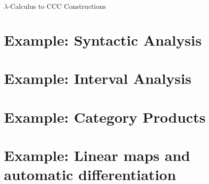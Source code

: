 \documentclass[10pt]{beamer}
\theoremstyle{definition}
\theoremstyle{remark}
\numberwithin{equation}{section}
\begin{document}
\begin{frame}[fragile]{$\lambda$-Calculus to CCC Constructions}
\end{frame}

\begin{frame}[fragile]{}
\end{frame}

\begin{frame}[fragile]{}
\end{frame}

\begin{frame}[fragile]{}
\end{frame}

\begin{frame}[fragile]{}
\end{frame}

\begin{frame}[fragile]{}
\end{frame}

\begin{frame}[fragile]{}
\end{frame}

\begin{frame}[fragile]{}
\end{frame}

\begin{frame}[fragile]{}
\end{frame}

\section{Example: Syntactic Analysis} %

\section{Example: Interval Analysis} %

\section{Example: Category Products} %

\section{Example: Linear maps and automatic differentiation} %
\end{document}
